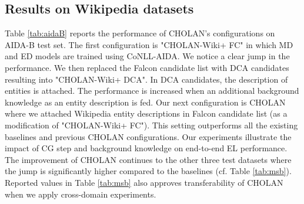 \documentclass[11pt,a4paper]{article}
\begin{document}
\subsection{Results on Wikipedia datasets} \label{sec:wikipediadata}
Table \ref{tab:aidaB} reports the performance of CHOLAN's configurations on AIDA-B test set. 
The first configuration is "CHOLAN-Wiki+ FC" in which MD and ED models are trained using CoNLL-AIDA. We notice a clear jump in the performance. We then replaced the Falcon candidate list  with DCA candidates  resulting into "CHOLAN-Wiki+ DCA". In DCA candidates, the description of entities is attached. The performance is increased when an additional background knowledge as an entity description is fed. Our next configuration is CHOLAN where we attached Wikipedia entity descriptions in Falcon candidate list  (as a modification of "CHOLAN-Wiki+ FC"). This setting outperforms all the existing baselines and previous CHOLAN configurations. Our experiments illustrate the impact of CG step and background knowledge on end-to-end EL performance. The improvement of CHOLAN continues to the other three test datasets where the jump is significantly higher compared to the baselines (cf. Table \ref{tab:msb}). Reported values in Table \ref{tab:msb} also approves transferability of CHOLAN when we apply cross-domain experiments.
\end{document}
